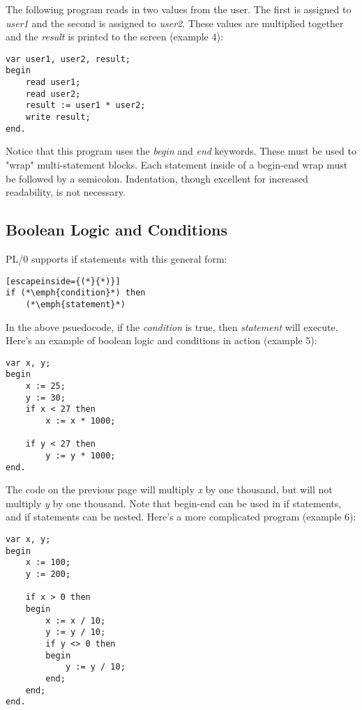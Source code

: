\documentclass[12pt]{memoir}
\begin{document}
The following program reads in two values from the user. The first is assigned to \emph{user1}
and the second is assigned to \emph{user2}. These values are multiplied together and
the \emph{result} is printed to the screen (example 4):
\begin{lstlisting}
var user1, user2, result;
begin
    read user1;
    read user2;
    result := user1 * user2;
    write result;
end.
\end{lstlisting}
Notice that this program uses the \emph{begin} and \emph{end} keywords. These must be used
to "wrap" multi-statement blocks. Each statement inside of a begin-end wrap must be followed
by a semicolon. Indentation, though excellent for increased readability, is not necessary.

\subsection*{Boolean Logic and Conditions}
PL/0 supports if statements with this general form:
\begin{lstlisting}[escapeinside={(*}{*)}]
if (*\emph{condition}*) then
    (*\emph{statement}*)
\end{lstlisting}
In the above psuedocode, if the \emph{condition} is true, then \emph{statement}
will execute. Here's an example of boolean logic and conditions in action (example 5):
\begin{lstlisting}
var x, y;
begin
    x := 25;
    y := 30;
    if x < 27 then
        x := x * 1000;

    if y < 27 then
        y := y * 1000;
end.
\end{lstlisting}

\pagebreak

The code on the previous page will multiply \emph{x} by one thousand, but will not multiply
\emph{y} by one thousand. Note that begin-end can be used in if statements, and if statements
can be nested. Here's a more complicated program (example 6):
\begin{lstlisting}
var x, y;
begin
    x := 100;
    y := 200;
    
    if x > 0 then
    begin
        x := x / 10;
        y := y / 10;
        if y <> 0 then
        begin
            y := y / 10;
        end;
    end;
end.
\end{lstlisting}
\end{document}
